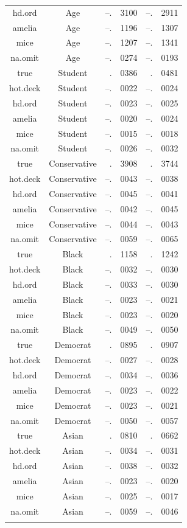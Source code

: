 \documentclass[12pt,econ]{sources/authesis}
\begin{document}
\begin{longtable}{ccr@{}lr@{}l}
 hd.ord & Age & --.&3100 & --.&2911 \\ 
 amelia & Age & --.&1196 & --.&1307 \\ 
 mice & Age & --.&1207 & --.&1341 \\ 
 na.omit & Age & --.&0274 & --.&0193 \\ 
 true & Student & .&0386 & .&0481 \\ 
 hot.deck & Student & --.&0022 & --.&0024 \\
 hd.ord & Student & --.&0023 & --.&0025 \\
 amelia & Student & --.&0020 & --.&0024 \\
 mice & Student & --.&0015 & --.&0018 \\
 na.omit & Student & --.&0026 & --.&0032 \\
 true & Conservative & .&3908 & .&3744 \\
 hot.deck & Conservative & --.&0043 & --.&0038 \\
 hd.ord & Conservative & --.&0045 & --.&0041 \\
 amelia & Conservative & --.&0042 & --.&0045 \\ 
 mice & Conservative & --.&0044 & --.&0043 \\
 na.omit & Conservative & --.&0059 & --.&0065 \\
 true & Black & .&1158 & .&1242 \\
 hot.deck & Black & --.&0032 & --.&0030 \\
 hd.ord & Black & --.&0033 & --.&0030 \\
 amelia & Black & --.&0023 & --.&0021 \\
 mice & Black & --.&0023 & --.&0020 \\ 
 na.omit & Black & --.&0049 & --.&0050 \\ 
 true & Democrat & .&0895 & .&0907 \\ 
 hot.deck & Democrat & --.&0027 & --.&0028 \\
 hd.ord & Democrat & --.&0034 & --.&0036 \\
 amelia & Democrat & --.&0023 & --.&0022 \\
 mice & Democrat & --.&0023 & --.&0021 \\ 
 na.omit & Democrat & --.&0050 & --.&0057 \\ 
 true & Asian & .&0810 & .&0662 \\ 
 hot.deck & Asian & --.&0034 & --.&0031 \\ 
 hd.ord & Asian & --.&0038 & --.&0032 \\ 
 amelia & Asian & --.&0023 & --.&0020 \\
 mice & Asian & --.&0025 & --.&0017 \\
 na.omit & Asian & --.&0059 & --.&0046 \\ 
 \hline \\[-1.8ex] 
 \end{longtable}
\dsp
\end{document}
